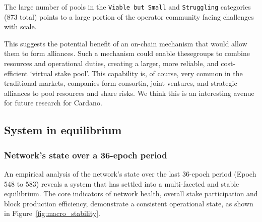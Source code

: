 \documentclass[11pt, letterpaper]{article}
\begin{document}
The large number of pools in the \texttt{Viable but Small} and
\texttt{Struggling} categories (873 total) points to a large portion of the
operator community facing challenges with scale.

This suggests the potential benefit of an on-chain mechanism that would allow
them to form alliances. Such a mechanism could enable thesegroups to combine
resources and operational duties, creating a larger, more reliable, and
cost-efficient `virtual stake pool'. This capability is, of course, very common
in the traditional markets, companies form consortia, joint ventures, and
strategic alliances to pool resources and share risks. We think this is an
interesting avenue for future research for Cardano.

\subsection{System in equilibrium}

\subsubsection{Network's state over a 36-epoch period}

An empirical analysis of the network's state over the last 36-epoch period (Epoch 548
to 583) reveals a system that has settled into a multi-faceted and stable
equilibrium. The core indicators of network health, overall stake participation
and block production efficiency, demonstrate a consistent operational
state, as shown in Figure~\ref{fig:macro_stability}.
\end{document}
